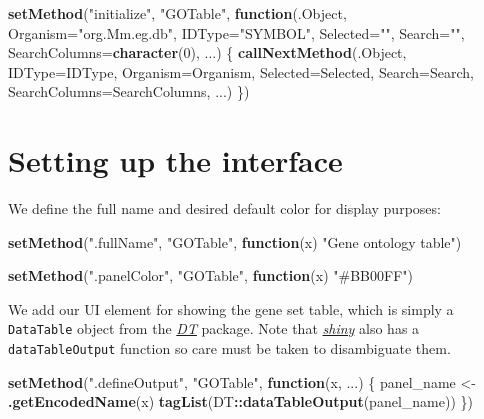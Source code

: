 \documentclass[]{book}
\newenvironment{Shaded}{\begin{snugshade}}{\end{snugshade}}
\newcommand{\KeywordTok}[1]{\textcolor[rgb]{0.13,0.29,0.53}{\textbf{#1}}}
\newcommand{\DataTypeTok}[1]{\textcolor[rgb]{0.13,0.29,0.53}{#1}}
\newcommand{\DecValTok}[1]{\textcolor[rgb]{0.00,0.00,0.81}{#1}}
\newcommand{\StringTok}[1]{\textcolor[rgb]{0.31,0.60,0.02}{#1}}
\newcommand{\ControlFlowTok}[1]{\textcolor[rgb]{0.13,0.29,0.53}{\textbf{#1}}}
\newcommand{\OperatorTok}[1]{\textcolor[rgb]{0.81,0.36,0.00}{\textbf{#1}}}
\newcommand{\NormalTok}[1]{#1}
\begin{document}
\begin{Shaded}
\begin{Highlighting}[]
\KeywordTok{setMethod}\NormalTok{(}\StringTok{"initialize"}\NormalTok{, }\StringTok{"GOTable"}\NormalTok{, }\ControlFlowTok{function}\NormalTok{(.Object, }
    \DataTypeTok{Organism=}\StringTok{"org.Mm.eg.db"}\NormalTok{, }\DataTypeTok{IDType=}\StringTok{"SYMBOL"}\NormalTok{, }
    \DataTypeTok{Selected=}\StringTok{""}\NormalTok{, }\DataTypeTok{Search=}\StringTok{""}\NormalTok{, }\DataTypeTok{SearchColumns=}\KeywordTok{character}\NormalTok{(}\DecValTok{0}\NormalTok{), ...)}
\NormalTok{\{}
    \KeywordTok{callNextMethod}\NormalTok{(.Object, }\DataTypeTok{IDType=}\NormalTok{IDType, }\DataTypeTok{Organism=}\NormalTok{Organism, }
        \DataTypeTok{Selected=}\NormalTok{Selected, }\DataTypeTok{Search=}\NormalTok{Search, }
        \DataTypeTok{SearchColumns=}\NormalTok{SearchColumns, ...)}
\NormalTok{\})}
\end{Highlighting}
\end{Shaded}

\section{Setting up the interface}\label{setting-up-the-interface-3}

We define the full name and desired default color for display purposes:

\begin{Shaded}
\begin{Highlighting}[]
\KeywordTok{setMethod}\NormalTok{(}\StringTok{".fullName"}\NormalTok{, }\StringTok{"GOTable"}\NormalTok{, }\ControlFlowTok{function}\NormalTok{(x) }\StringTok{"Gene ontology table"}\NormalTok{)}

\KeywordTok{setMethod}\NormalTok{(}\StringTok{".panelColor"}\NormalTok{, }\StringTok{"GOTable"}\NormalTok{, }\ControlFlowTok{function}\NormalTok{(x) }\StringTok{"#BB00FF"}\NormalTok{)}
\end{Highlighting}
\end{Shaded}

We add our UI element for showing the gene set table, which is simply a
\texttt{DataTable} object from the
\emph{\href{https://CRAN.R-project.org/package=DT}{DT}} package. Note
that \emph{\href{https://CRAN.R-project.org/package=shiny}{shiny}} also
has a \texttt{dataTableOutput} function so care must be taken to
disambiguate them.

\begin{Shaded}
\begin{Highlighting}[]
\KeywordTok{setMethod}\NormalTok{(}\StringTok{".defineOutput"}\NormalTok{, }\StringTok{"GOTable"}\NormalTok{, }\ControlFlowTok{function}\NormalTok{(x, ...) \{}
\NormalTok{    panel_name <-}\StringTok{ }\KeywordTok{.getEncodedName}\NormalTok{(x)}
    \KeywordTok{tagList}\NormalTok{(DT}\OperatorTok{::}\KeywordTok{dataTableOutput}\NormalTok{(panel_name))}
\NormalTok{\})}
\end{Highlighting}
\end{Shaded}
\end{document}
